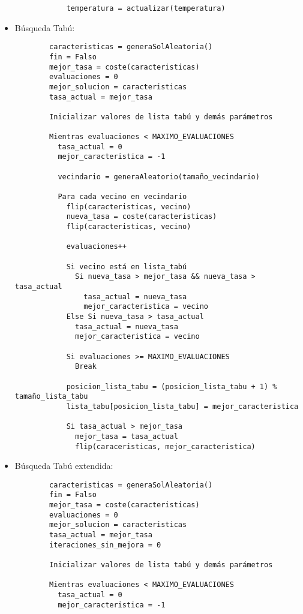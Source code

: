 \documentclass[a4paper, 11pt]{article}
\begin{document}
\begin{itemize}
\begin{verbatim}
            temperatura = actualizar(temperatura)
      \end{verbatim}
      \item Búsqueda Tabú:
      \begin{verbatim}
        caracteristicas = generaSolAleatoria()
        fin = Falso
        mejor_tasa = coste(caracteristicas)
        evaluaciones = 0
        mejor_solucion = caracteristicas
        tasa_actual = mejor_tasa

        Inicializar valores de lista tabú y demás parámetros

        Mientras evaluaciones < MAXIMO_EVALUACIONES
          tasa_actual = 0
          mejor_caracteristica = -1

          vecindario = generaAleatorio(tamaño_vecindario)

          Para cada vecino en vecindario
            flip(caracteristicas, vecino)
            nueva_tasa = coste(caracteristicas)
            flip(caracteristicas, vecino)

            evaluaciones++

            Si vecino está en lista_tabú
              Si nueva_tasa > mejor_tasa && nueva_tasa > tasa_actual
                tasa_actual = nueva_tasa
                mejor_caracteristica = vecino
            Else Si nueva_tasa > tasa_actual
              tasa_actual = nueva_tasa
              mejor_caracteristica = vecino

            Si evaluaciones >= MAXIMO_EVALUACIONES
              Break

            posicion_lista_tabu = (posicion_lista_tabu + 1) % tamaño_lista_tabu
            lista_tabu[posicion_lista_tabu] = mejor_caracteristica

            Si tasa_actual > mejor_tasa
              mejor_tasa = tasa_actual
              flip(caraceristicas, mejor_caracteristica)
      \end{verbatim}
      \item Búsqueda Tabú extendida:
      \begin{verbatim}
        caracteristicas = generaSolAleatoria()
        fin = Falso
        mejor_tasa = coste(caracteristicas)
        evaluaciones = 0
        mejor_solucion = caracteristicas
        tasa_actual = mejor_tasa
        iteraciones_sin_mejora = 0

        Inicializar valores de lista tabú y demás parámetros

        Mientras evaluaciones < MAXIMO_EVALUACIONES
          tasa_actual = 0
          mejor_caracteristica = -1


\end{verbatim}
\end{itemize}
\end{document}
